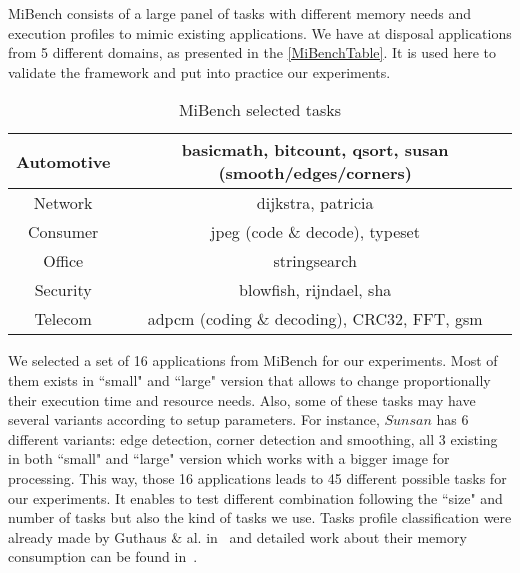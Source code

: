 \documentclass[french, a4paper, 11pt, twoside, pdftex]{StyleThese}
\begin{document}
            MiBench consists of a large panel of tasks with different memory needs and execution profiles to mimic existing applications. We have at disposal applications from 5 different domains, as presented in the \autoref{MiBenchTable}. It is used here to validate the framework and put into practice our experiments.\\
            \begin{table}[!t]
                \renewcommand{\arraystretch}{1.3}
                \caption{MiBench selected tasks}
                \label{MiBenchTable}
                \centering
                \begin{tabular}{|c||c|}
                    \hline
                    Automotive  & basicmath, bitcount, qsort, susan (smooth/edges/corners)\\
                    \hline
                    Network     & dijkstra, patricia                                        \\
                    \hline
                    Consumer    & jpeg (code \& decode), typeset                            \\
                    \hline
                    Office      & stringsearch                                              \\
                    \hline
                    Security    & blowfish, rijndael, sha                                   \\
                    \hline
                    Telecom     & adpcm (coding \& decoding), CRC32, FFT, gsm               \\
                    \hline
                \end{tabular}
            \end{table}
            We selected a set of 16 applications from MiBench for our experiments. Most of them exists in ``small" and ``large" version that allows to change proportionally their execution time and resource needs. Also, some of these tasks may have several variants according to setup parameters. For instance, $Sunsan$ has 6 different variants: edge detection, corner detection and smoothing, all 3 existing in both ``small" and ``large" version which works with a bigger image for processing. This way, those 16 applications leads to 45 different possible tasks for our experiments. It enables to test different combination following the ``size" and number of tasks but also the kind of tasks we use.
            Tasks profile classification were already made by Guthaus \& al. in~\cite{guthaus_mibench_2001} and detailed work about their memory consumption can be found in~\cite{blin_understanding_2016}. 
        
\end{document}
